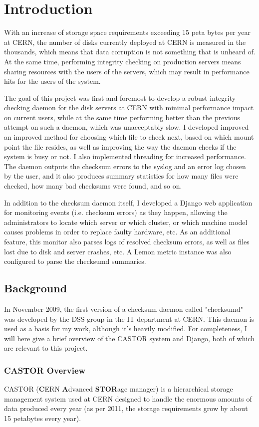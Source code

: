 \section{Introduction}
With an increase of storage space requirements exceeding 15 peta bytes per year at CERN, the number of disks currently deployed at CERN is measured in the thousands, which means that data corruption is not something that is unheard of. At the same time, performing integrity checking on production servers means sharing resources with the users of the servers, which may result in performance hits for the users of the system. 

The goal of this project was first and foremost to develop a robust integrity checking daemon for the disk servers at CERN with minimal performance impact on current users, while at the same time performing better than the previous attempt on such a daemon, which was unacceptably slow. I developed improved an improved method for choosing which file to check next, based on which mount point the file resides, as well as improving the way the daemon checks if the system is busy or not. I also implemented threading for increased performance. The daemon outputs the checksum errors to the syslog and an error log chosen by the user, and it also produces summary statistics for how many files were checked, how many bad checksums were found, and so on. 

In addition to the checksum daemon itself, I developed a Django web application for monitoring events (i.e. checksum errors) as they happen, allowing the administrators to locate which server or which cluster, or which machine model causes problems in order to replace faulty hardware, etc. As an additional feature, this monitor also parses logs of resolved checksum errors, as well as files lost due to disk and server crashes, etc. A Lemon metric instance was also configured to parse the checksumd summaries.

\subsection{Background}
In November 2009, the first version of a checksum daemon called "checksumd" was developed by the DSS group in the IT department at CERN. This daemon is used as a basis for my work, although it's heavily modified. For completeness, I will here give a brief overview of the CASTOR system and Django, both of which are relevant to this project.

\subsubsection{CASTOR Overview}
CASTOR ({\bf C}ERN {\bf A}dvanced {\bf STOR}age manager) is a hierarchical storage management system used at CERN\cite{castor} designed to handle the enormous amounts of data produced every year (as per 2011, the storage requirements grow by about 15 petabytes every year). 

